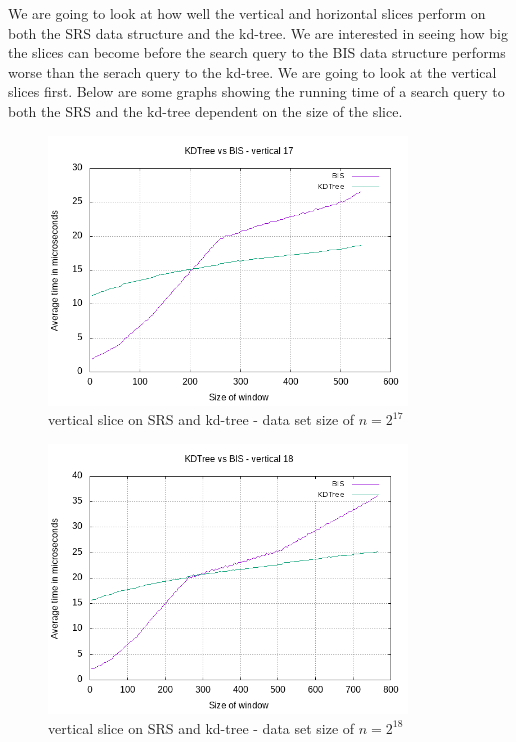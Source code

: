 We are going to look at how well the vertical and horizontal slices perform on both the SRS data structure and the kd-tree. We are interested in seeing how big the slices can become before the search query to the BIS data structure performs worse than the serach query to the kd-tree. We are going to look at the vertical slices first. Below are some graphs showing the running time of a search query to both the SRS and the kd-tree dependent on the size of the slice. 


\begin{figure}[h]
    \centering
    \includegraphics[width = 0.85\textwidth]{pictures/analysis/vert_17.png}
    \caption{vertical slice on SRS and kd-tree - data set size of $n=2^{17}$}\label{fig:vert_17}
\end{figure}

\begin{figure}[h]
    \centering
    \includegraphics[width = 0.85\textwidth]{pictures/analysis/vert_18.png}
    \caption{vertical slice on SRS and kd-tree - data set size of $n=2^{18}$}\label{fig:vert_18}
\end{figure}


